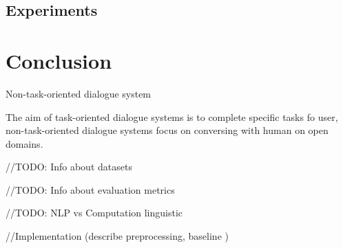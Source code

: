 \section{Experiments}


\chapter{Conclusion}

Non-task-oriented dialogue system

The aim of task-oriented dialogue systems is to complete specific tasks fo user, non-task-oriented dialogue systems focus on conversing with human on open domains. 

//TODO: Info about datasets

//TODO: Info about evaluation metrics

//TODO: NLP vs Computation linguistic

//Implementation (describe preprocessing, baseline )
